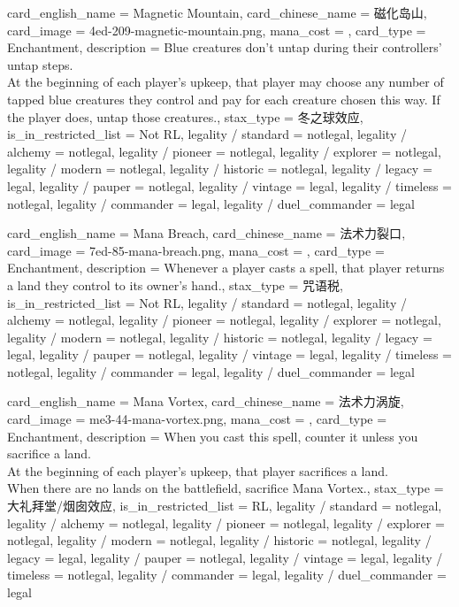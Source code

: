 \documentclass[lang = cn, color = black, 10pt]{AllThatStax}
\begin{document}
\card
{
	card_english_name = {Magnetic Mountain},
	card_chinese_name = {磁化岛山},
	card_image = 4ed-209-magnetic-mountain.png,
	mana_cost = ,
	card_type = Enchantment,
	description = {Blue creatures don't untap during their controllers' untap steps.\\
		At the beginning of each player's upkeep, that player may choose any number of tapped blue creatures they control and pay  for each creature chosen this way. If the player does, untap those creatures.},
	stax_type = 冬之球效应,
	is_in_restricted_list = Not RL,
	legality / standard = notlegal,
	legality / alchemy = notlegal,
	legality / pioneer = notlegal,
	legality / explorer = notlegal,
	legality / modern = notlegal,
	legality / historic = notlegal,
	legality / legacy = legal,
	legality / pauper = notlegal,
	legality / vintage = legal,
	legality / timeless = notlegal,
	legality / commander = legal,
	legality / duel_commander = legal
}

\card
{
	card_english_name = {Mana Breach},
	card_chinese_name = {法术力裂口},
	card_image = 7ed-85-mana-breach.png,
	mana_cost = ,
	card_type = Enchantment,
	description = {Whenever a player casts a spell, that player returns a land they control to its owner's hand.},
	stax_type = 咒语税,
	is_in_restricted_list = Not RL,
	legality / standard = notlegal,
	legality / alchemy = notlegal,
	legality / pioneer = notlegal,
	legality / explorer = notlegal,
	legality / modern = notlegal,
	legality / historic = notlegal,
	legality / legacy = legal,
	legality / pauper = notlegal,
	legality / vintage = legal,
	legality / timeless = notlegal,
	legality / commander = legal,
	legality / duel_commander = legal
}

\card
{
	card_english_name = {Mana Vortex},
	card_chinese_name = {法术力涡旋},
	card_image = me3-44-mana-vortex.png,
	mana_cost = ,
	card_type = Enchantment,
	description = {When you cast this spell, counter it unless you sacrifice a land.\\
		At the beginning of each player's upkeep, that player sacrifices a land.\\
		When there are no lands on the battlefield, sacrifice Mana Vortex.},
	stax_type = 大礼拜堂/烟囱效应,
	is_in_restricted_list = RL,
	legality / standard = notlegal,
	legality / alchemy = notlegal,
	legality / pioneer = notlegal,
	legality / explorer = notlegal,
	legality / modern = notlegal,
	legality / historic = notlegal,
	legality / legacy = legal,
	legality / pauper = notlegal,
	legality / vintage = legal,
	legality / timeless = notlegal,
	legality / commander = legal,
	legality / duel_commander = legal
}
\end{document}
